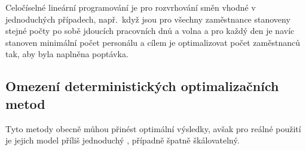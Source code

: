 \documentclass[twoside]{ctuthesis}
\begin{document}
Celočíselné lineární programování je pro rozvrhování směn vhodné v jed\-no\-du\-chých případech, např.~když jsou pro všechny zaměstnance stanoveny stejné počty po sobě jdoucích pracovních dnů a volna a pro každý den je navíc stanoven minimální počet personálu a cílem je optimalizovat počet zaměstnanců tak, aby byla naplněna poptávka. \cite{satheeshkumar2014linear}

%
% 	
%
% 	
%
%

\subsection{Omezení deterministických optimalizačních metod}
Tyto metody obecně můhou přinést optimální výsledky, avšak pro reálné použití je jejich model příliš jednoduchý \cite{burke2004state}, případně špatně škálovatelný.
\end{document}
